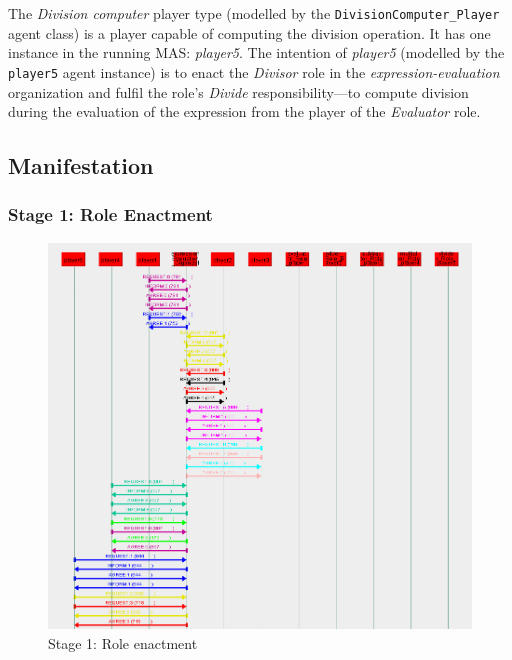 The \textit{Division computer} player type (modelled by the \texttt{DivisionComputer\_Player} agent class) is a player capable of computing the division operation.
It has one instance in the running MAS: \textit{player5}.
The intention of \textit{player5} (modelled by the \texttt{player5} agent instance) is to enact the \textit{Divisor} role in the \textit{expression-evaluation} organization and fulfil the role's \textit{Divide} responsibility---to compute division during the evaluation of the expression from the player of the \textit{Evaluator} role.

\subsection*{Manifestation}

\subsubsection*{Stage 1: Role Enactment}

\begin{figure}[H]
	\centering
	\includegraphics[width=\textwidth]{images/examples/example2-stage1.png}
	\caption{Stage 1: Role enactment}
	\label{figure:example2-stage1}
\end{figure}

